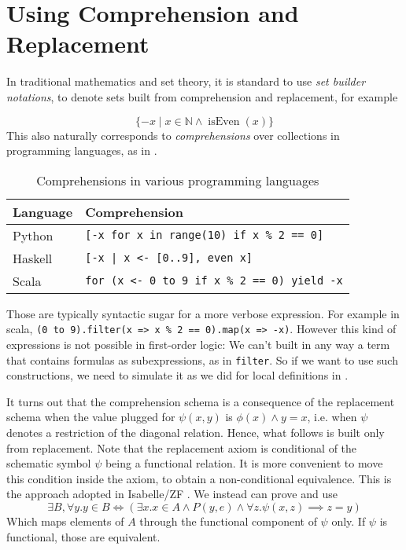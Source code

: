 \section{Using Comprehension and Replacement}

In traditional mathematics and set theory, it is standard to use \textit{set builder notations}, to denote sets built from comprehension and replacement, for example

$$\lbrace -x \mid x\in \mathbb N \land \operatorname{isEven}(x) \rbrace$$
This also naturally corresponds to \textit{comprehensions} over collections in programming languages, as in .
\begin{table}[h]
  \begin{tabular}{l|l}
    \textbf{Language} & \textbf{Comprehension} \\ \hline
    Python            & \lstinline$[-x for x in range(10) if x % 2 == 0]$ \\
      Haskell           & \lstinline$[-x | x <- [0..9], even x]$ \\
      Scala             & \lstinline$for (x <- 0 to 9 if x % 2 == 0) yield -x$ \\
      \end{tabular}
      \caption{Comprehensions in various programming languages}
      \label{tab:comprehensionsProgramming}
    \end{table}
    Those are typically syntactic sugar for a more verbose expression. For example in scala, \lstinline|(0 to 9).filter(x => x % 2 == 0).map(x => -x)|. However this kind of expressions is not possible in first-order logic: We can't built in any way a term that contains formulas as subexpressions, as in \lstinline|filter|. So if we want to use such constructions, we need to simulate it as we did for local definitions in .

      It turns out that the comprehension schema is a consequence of the replacement schema when the value plugged for $\psi(x, y)$ is $\phi(x) \land y = x$, i.e. when $\psi$ denotes a restriction of the diagonal relation. Hence, what follows is built only from replacement.
      Note that the replacement axiom  is conditional of the schematic symbol $\psi$ being a functional relation. It is more convenient to move this condition inside the axiom, to obtain a non-conditional equivalence. This is the approach adopted in Isabelle/ZF \cite{noelExperimentingIsabelleZF1993}. We instead can prove and use
      $$ \exists B, \forall y. y \in B \iff (\exists x. x \in A \land P(y, e) \land ∀ z. \psi(x, z) \implies z = y) $$
      Which maps elements of $A$ through the functional component of $\psi$ only. If $\psi$ is functional, those are equivalent.

